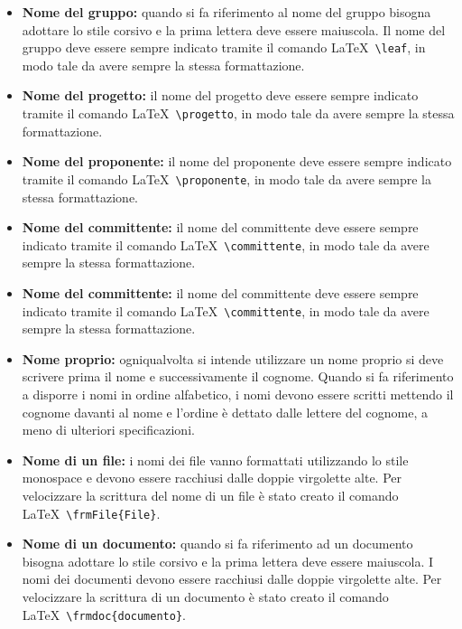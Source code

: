 \documentclass[../NormeProgetto.tex]{subfiles}
\begin{document}
				\begin{itemize}
					\item \textbf{Nome del gruppo:} quando si fa riferimento al nome del gruppo bisogna adottare lo stile corsivo e la prima lettera deve essere maiuscola.	
				Il nome del gruppo deve essere sempre indicato tramite il comando \LaTeX\ \texttt{\textbackslash leaf}, in modo tale da avere sempre la stessa formattazione.
				\item \textbf{Nome del progetto:} il nome del progetto deve essere sempre indicato tramite il comando \LaTeX\ \texttt{\textbackslash progetto}, in modo tale da avere sempre la stessa formattazione.
				\item \textbf{Nome del proponente:} il nome del proponente deve essere sempre indicato tramite il comando \LaTeX\ \texttt{\textbackslash proponente}, in modo tale da avere sempre la stessa formattazione.
				\item \textbf{Nome del committente:} il nome del committente deve essere sempre indicato tramite il comando \LaTeX\ \texttt{\textbackslash committente}, in modo tale da avere sempre la stessa formattazione.
				\item \textbf{Nome del committente:} il nome del committente deve essere sempre indicato tramite il comando \LaTeX\ \texttt{\textbackslash committente}, in modo tale da avere sempre la stessa formattazione.				
				\item \textbf{Nome proprio:} ogniqualvolta si intende utilizzare un nome proprio si deve scrivere prima il nome e successivamente il cognome. Quando si fa riferimento a disporre i nomi in ordine alfabetico, i nomi devono essere scritti mettendo il cognome davanti al nome e l'ordine è dettato dalle lettere del cognome, a meno di ulteriori specificazioni.				
				\item \textbf{Nome di un file:} i nomi dei file vanno formattati utilizzando lo stile monospace e devono essere racchiusi dalle doppie virgolette alte.  Per velocizzare la scrittura del nome di un file è stato creato il comando \LaTeX\ \texttt{\textbackslash frmFile\{File\}}.				
				\item \textbf{Nome di un documento:} quando si fa riferimento ad un documento bisogna adottare lo stile corsivo e la prima lettera deve essere maiuscola. I  nomi dei documenti devono essere racchiusi dalle doppie virgolette alte. Per velocizzare la scrittura di un documento è stato creato il comando \LaTeX\ \texttt{\textbackslash frmdoc\{documento\}}.				
				\end{itemize}
\end{document}
